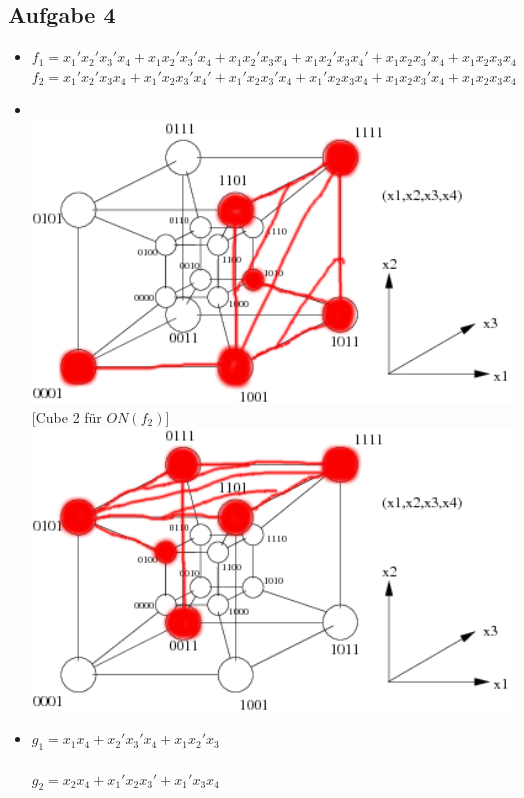 \documentclass{scrartcl}
\begin{document}
	\subsection*{Aufgabe 4}
	\begin{itemize}
		\item[a)] 
		$f_1 = x_1'x_2'x_3'x_4 + x_1x_2'x_3'x_4  + x_1x_2'x_3x_4  + x_1x_2'x_3x_4' + x_1x_2x_3'x_4 + x_1x_2x_3x_4$ \\
		$f_2 = x_1'x_2'x_3x_4  + x_1'x_2x_3'x_4' + x_1'x_2x_3'x_4 + x_1'x_2x_3x_4 + x_1x_2x_3'x_4 + x_1x_2x_3x_4$
		\item[b)] [Cube 1 für $ON(f_1)$] \\
		\includegraphics[width=14cm]{hypercube1.png}
		[Cube 2 für $ON(f_2)$] \\
		\includegraphics[width=14cm]{hypercube2.png}
		
		\item[c)] $g_1 = x_1x_4 + x_2'x_3'x_4 + x_1x_2'x_3 $ \\
		\\
		$g_2 = x_2x_4 + x_1'x_2x_3' + x_1'x_3x_4 $
		
	\end{itemize}
	
\end{document}
